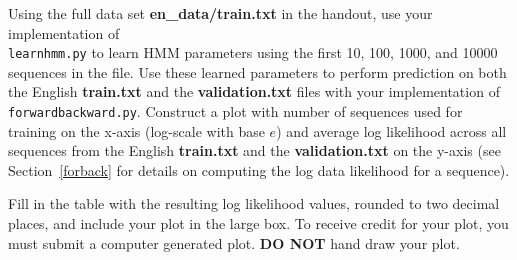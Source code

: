 \documentclass[11pt,addpoints,answers]{exam}
\begin{document}
\begin{questions}
Using the full data set \textbf{en\_data/train.txt} in the handout, use your implementation of\\ \texttt{learnhmm.py} to learn HMM parameters using the first 10, 100, 1000, and 10000 sequences in the file.
Use these learned parameters to perform prediction on both the English \textbf{train.txt} and the \textbf{validation.txt} files with your implementation of \texttt{forwardbackward.py}.
Construct a plot with number of sequences used for training on the x-axis (log-scale with base $e$) and average log likelihood across all sequences from the English \textbf{train.txt} and the \textbf{validation.txt} on the y-axis (see Section~\ref{forback} for details on computing the log data likelihood for a sequence).

Fill in the table with the resulting log likelihood values, rounded to two decimal places, and 
include your plot in the large box.
To receive credit for your plot, you must submit a computer generated plot.
\textbf{DO NOT} hand draw your plot.


\clearpage
\newpage
\end{questions}
\newpage
\end{document}
